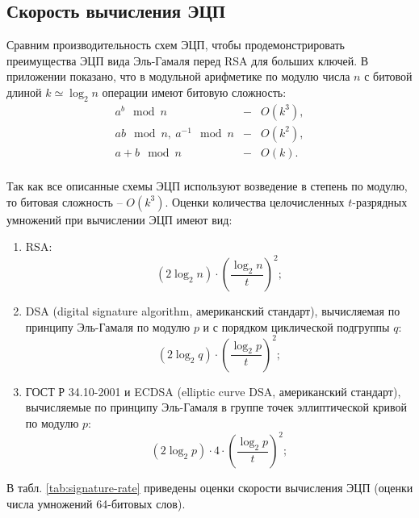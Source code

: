 \subsection*{Скорость вычисления ЭЦП}

Сравним производительность схем ЭЦП, чтобы продемонстрировать преимущества ЭЦП вида Эль-Гамаля перед RSA для больших ключей. В приложении показано, что в модульной арифметике по модулю числа $n$ с битовой длиной $k \simeq \log_2 n$ операции имеют битовую сложность:
\[ \begin{array}{lcl}
    a^b \mod n & - & O(k^3), \\
    ab \mod n, ~ a^{-1} \mod n & - & O(k^2), \\
    a+b \mod n & - & O(k). \\
\end{array} \]

Так как все описанные схемы ЭЦП используют возведение в степень по модулю, то битовая сложность -- $O(k^3)$. Оценки количества целочисленных $t$-разрядных  умножений при вычислении ЭЦП имеют вид:
\begin{enumerate}
    \item RSA:
        \[ (2 \log_2 n) \cdot \left( \frac{\log_2 n}{t} \right)^2; \]
    \item DSA (digital signature algorithm, американский стандарт), вычисляемая по принципу Эль-Гамаля по модулю $p$ и с порядком циклической подгруппы $q$:
        \[ (2 \log_2 q) \cdot \left( \frac{\log_2 p}{t} \right)^2; \]
    \item ГОСТ Р 34.10-2001 и ECDSA (elliptic curve DSA, американский стандарт), вычисляемые по принципу Эль-Гамаля в группе точек эллиптической кривой по модулю $p$:
        \[ (2 \log_2 p) \cdot 4 \cdot \left( \frac{\log_2 p}{t} \right)^2; \]
\end{enumerate}
В табл. \ref{tab:signature-rate} приведены оценки скорости вычисления ЭЦП (оценки числа умножений 64-битовых слов).


